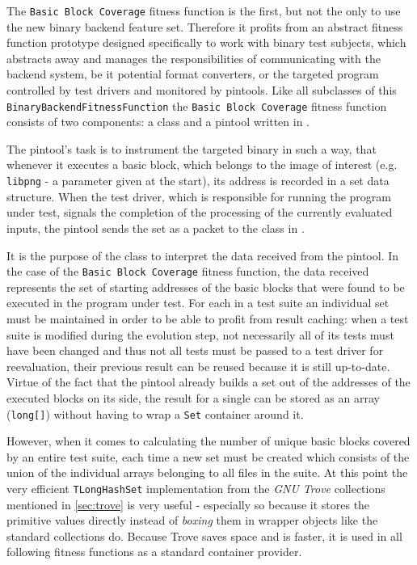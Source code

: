 The \texttt{Basic Block Coverage} fitness function is the first, but not the only to use the new binary 
backend feature set. Therefore it profits from an abstract fitness function prototype designed specifically 
to work with binary test subjects, which abstracts away and manages the responsibilities of communicating 
with the backend system, be it potential format converters, or the targeted program controlled by test 
drivers and monitored by pintools.
Like all subclasses of this \texttt{BinaryBackendFitnessFunction} the \texttt{Basic Block Coverage} 
fitness function consists of two components: a \java class and a pintool written in \cpp.

The pintool's task is to instrument the targeted binary in such a way, that whenever it executes a 
basic block, which belongs to the image of interest (e.g. \texttt{libpng} - a parameter given at the start),
its address is recorded in a set data structure. When the test driver, which is responsible for running 
the program under test, signals the completion of the processing of the currently evaluated inputs, 
the pintool sends the set as a packet to the \java class in \xmlmate.

It is the purpose of the \java class to interpret the data received from the pintool.
In the case of the \texttt{Basic Block Coverage} fitness function, the data received represents the
set of starting addresses of the basic blocks that were found to be executed in the program under test. 
For each \xml in a test suite an individual set must be maintained in order to be able to profit 
from result caching: when a test suite is modified during the evolution step, not necessarily all
of its tests must have been changed and thus not all tests must be passed to a test driver for reevaluation, 
their previous result can be reused because it is still up-to-date. Virtue of the fact that the pintool 
already builds a set out of the addresses of the executed blocks on its side, the result for a single 
\xml can be stored as an array (\texttt{long[]}) without having to wrap a \texttt{Set} container around it.

However, when it comes to calculating the number of unique basic blocks covered by an 
entire test suite, each time a new set must be created which consists of the union of 
the individual arrays belonging to all \xml files in the suite. At this point the very efficient
\texttt{TLongHashSet} implementation from the \emph{GNU Trove} collections mentioned in \cref{sec:trove} 
is very useful - especially so because it stores the \java primitive values directly instead of \emph{boxing}
them in wrapper objects like the standard \java collections do. Because Trove saves space and is faster, it is
used in all following fitness functions as a standard container provider.

